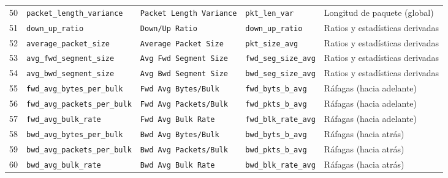 \begin{landscape}
\begin{longtable}{@{}r p{4.2cm} p{4.4cm} p{4.1cm} p{4.8cm}@{}}
50 & \texttt{packet\_\allowbreak{}length\_\allowbreak{}variance} & \texttt{Packet Length Variance} & \texttt{pkt\_\allowbreak{}len\_\allowbreak{}var} & Longitud de paquete (global) \\
51 & \texttt{down\_\allowbreak{}up\_\allowbreak{}ratio} & \texttt{Down/Up Ratio} & \texttt{down\_\allowbreak{}up\_\allowbreak{}ratio} & Ratios y estadísticas derivadas \\
52 & \texttt{average\_\allowbreak{}packet\_\allowbreak{}size} & \texttt{Average Packet Size} & \texttt{pkt\_\allowbreak{}size\_\allowbreak{}avg} & Ratios y estadísticas derivadas \\
53 & \texttt{avg\_\allowbreak{}fwd\_\allowbreak{}segment\_\allowbreak{}size} & \texttt{Avg Fwd Segment Size} & \texttt{fwd\_\allowbreak{}seg\_\allowbreak{}size\_\allowbreak{}avg} & Ratios y estadísticas derivadas \\
54 & \texttt{avg\_\allowbreak{}bwd\_\allowbreak{}segment\_\allowbreak{}size} & \texttt{Avg Bwd Segment Size} & \texttt{bwd\_\allowbreak{}seg\_\allowbreak{}size\_\allowbreak{}avg} & Ratios y estadísticas derivadas \\
55 & \texttt{fwd\_\allowbreak{}avg\_\allowbreak{}bytes\_\allowbreak{}per\_\allowbreak{}bulk} & \texttt{Fwd Avg Bytes/Bulk} & \texttt{fwd\_\allowbreak{}byts\_\allowbreak{}b\_\allowbreak{}avg} & Ráfagas (hacia adelante) \\
56 & \texttt{fwd\_\allowbreak{}avg\_\allowbreak{}packets\_\allowbreak{}per\_\allowbreak{}bulk} & \texttt{Fwd Avg Packets/Bulk} & \texttt{fwd\_\allowbreak{}pkts\_\allowbreak{}b\_\allowbreak{}avg} & Ráfagas (hacia adelante) \\
57 & \texttt{fwd\_\allowbreak{}avg\_\allowbreak{}bulk\_\allowbreak{}rate} & \texttt{Fwd Avg Bulk Rate} & \texttt{fwd\_\allowbreak{}blk\_\allowbreak{}rate\_\allowbreak{}avg} & Ráfagas (hacia adelante) \\
58 & \texttt{bwd\_\allowbreak{}avg\_\allowbreak{}bytes\_\allowbreak{}per\_\allowbreak{}bulk} & \texttt{Bwd Avg Bytes/Bulk} & \texttt{bwd\_\allowbreak{}byts\_\allowbreak{}b\_\allowbreak{}avg} & Ráfagas (hacia atrás) \\
59 & \texttt{bwd\_\allowbreak{}avg\_\allowbreak{}packets\_\allowbreak{}per\_\allowbreak{}bulk} & \texttt{Bwd Avg Packets/Bulk} & \texttt{bwd\_\allowbreak{}pkts\_\allowbreak{}b\_\allowbreak{}avg} & Ráfagas (hacia atrás) \\
60 & \texttt{bwd\_\allowbreak{}avg\_\allowbreak{}bulk\_\allowbreak{}rate} & \texttt{Bwd Avg Bulk Rate} & \texttt{bwd\_\allowbreak{}blk\_\allowbreak{}rate\_\allowbreak{}avg} & Ráfagas (hacia atrás) \\

\end{longtable}
\end{landscape}
